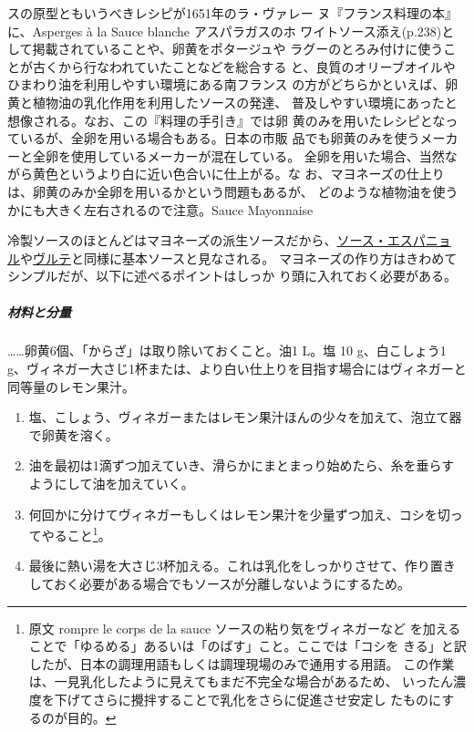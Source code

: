 \begin{recette}
{{{{{  ス}の原型ともいうべきレシピが1651年のラ・ヴァレー
  ヌ『フランス料理の本』に、Asperges à la Sauce blanche アスパラガスのホ
  ワイトソース添え(p.238)として掲載されていることや、卵黄をポタージュや
  ラグーのとろみ付けに使うことが古くから行なわれていたことなどを総合する
  と、良質のオリーブオイルやひまわり油を利用しやすい環境にある南フランス
  の方がどちらかといえば、卵黄と植物油の乳化作用を利用したソースの発達、
  普及しやすい環境にあったと想像される。なお、この『料理の手引き』では卵
  黄のみを用いたレシピとなっているが、全卵を用いる場合もある。日本の市販
  品でも卵黄のみを使うメーカーと全卵を使用しているメーカーが混在している。
  全卵を用いた場合、当然ながら黄色というより白に近い色合いに仕上がる。な
  お、マヨネーズの仕上りは、卵黄のみか全卵を用いるかという問題もあるが、
  どのような植物油を使うかにも大きく左右されるので注意。}}{Sauce Mayonnaise}}\label{mayonnaise}}


冷製ソースのほとんどはマヨネーズの派生ソースだから、\protect\hyperlink{sauce-espagnole}{ソース・エスパニョ
ル}や\protect\hyperlink{veloute}{ヴルテ}と同様に基本ソースと見なされる。
マヨネーズの作り方はきわめてシンプルだが、以下に述べるポイントはしっか
り頭に入れておく必要がある。

\hypertarget{ux6750ux6599ux3068ux5206ux91cf}{%
\subparagraph{材料と分量}\label{ux6750ux6599ux3068ux5206ux91cf}}

\ldots{}\ldots{}卵黄6個、「からざ」は取り除いておくこと。油1 L。塩 10
g、白こしょう1
g、ヴィネガー大さじ1\undemi{}杯または、より白い仕上りを目指す場合にはヴィネガーと同等量のレモン果汁。

\begin{enumerate}
\def\labelenumi{\arabic{enumi}.}
\item
  塩、こしょう、ヴィネガーまたはレモン果汁ほんの少々を加えて、泡立て器で卵黄を溶く。
\item
  油を最初は1滴ずつ加えていき、滑らかにまとまっり始めたら、糸を垂らすようにして油を加えていく。
\item
  何回かに分けてヴィネガーもしくはレモン果汁を少量ずつ加え、コシを切ってやること\footnote{原文
    rompre le corps de la sauce ソースの粘り気をヴィネガーなど
    を加えることで「ゆるめる」あるいは「のばす」こと。ここでは「コシを
    きる」と訳したが、日本の調理用語もしくは調理現場のみで通用する用語。
    この作業は、一見乳化したように見えてもまだ不完全な場合があるため、
    いったん濃度を下げてさらに攪拌することで乳化をさらに促進させ安定し
    たものにするのが目的。}。
\item
  最後に熱い湯を大さじ3杯加える。これは乳化をしっかりさせて、作り置きしておく必要がある場合でもソースが分離しないようにするため。
\end{enumerate}


\end{recette}
